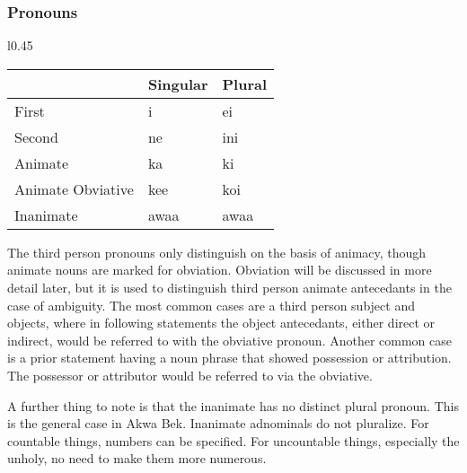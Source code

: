 \documentclass[11pt,letterpaper]{article}
\begin{document}
    \subsubsection{Pronouns}
    \label{pronouns}
    \begin{wrapfigure}{l}{0.45\textwidth}
      \begin{tabular}{|l|l|l|}
        \hline
                            & Singular  & Plural \\ \hline \hline
        First               & i         & ei     \\
        Second              & ne        & ini    \\
        Animate             & ka        & ki     \\
        Animate Obviative   & kee       & koi    \\
        Inanimate           & awaa      & awaa   \\ \hline
      \end{tabular}
    \end{wrapfigure}
    The third person pronouns only distinguish on the basis of animacy, though animate nouns are marked for obviation. Obviation will be discussed in more detail later, but it is used to distinguish third person animate antecedants in the case of ambiguity. The most common cases are a third person subject and objects, where in following statements the object antecedants, either direct or indirect, would be referred to with the obviative pronoun. Another common case is a prior statement having a noun phrase that showed possession or attribution. The possessor or attributor would be referred to via the obviative.
    \par
    A further thing to note is that the inanimate has no distinct plural pronoun. This is the general case in Akwa Bek. Inanimate adnominals do not pluralize. For countable things, numbers can be specified. For uncountable things, especially the unholy, no need to make them more numerous.
\end{document}
